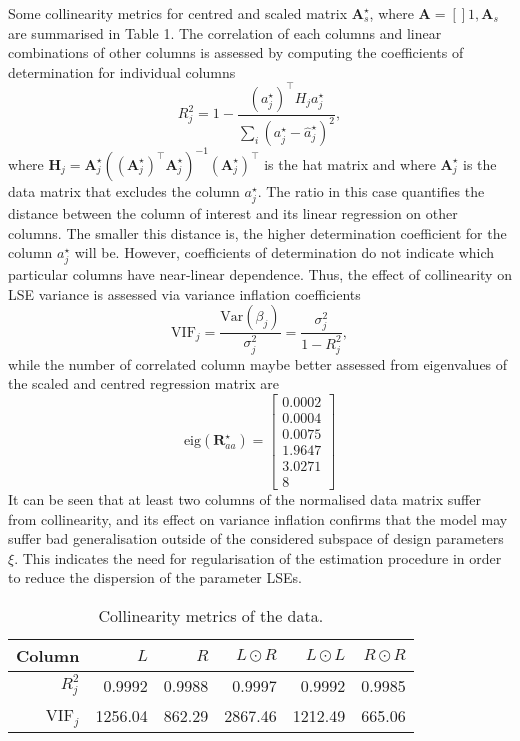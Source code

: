 \documentclass[a4paper,11pt,twoside]{article}
\theoremstyle{mytheoremstyle}
\begin{document}
Some collinearity metrics for centred and scaled matrix $\mathbf{A}_{s}^{\star}$, where $\mathbf{A} = \left[\right]1, \mathbf{A}_{s}$ are summarised in Table 1. The correlation of each columns and linear combinations of other columns is assessed by computing the coefficients of determination for individual columns
\begin{equation*}
R^{2}_{j} = 1 - \frac{(a^{\star}_{j})^{\top} H_j a^{\star}_{j}}{\sum_{i}( a^{\star}_{j} - \hat{a}^{\star}_{j})^2},
\end{equation*} 
where $ \mathbf{H}_j = \mathbf{A}_{j}^{\star}((\mathbf{A}_{j}^{\star})^{\top}\mathbf{A}_{j}^{\star})^{-1}(\mathbf{A}_{j}^{\star})^{\top}$ is the hat matrix and where $\mathbf{A}_{j}^{\star}$ is the data matrix that excludes the column $a^{\star}_{j}$. The ratio in this case quantifies the distance between the column of interest and its linear  regression on other columns. The smaller this distance is, the higher determination coefficient for the column $a^{\star}_{j}$ will be. However, coefficients of determination do not indicate which particular columns have near-linear dependence. Thus, the effect of collinearity on LSE variance is assessed via variance inflation coefficients
\begin{equation*}
\text{VIF}_j = \frac{\text{Var}(\beta_j)}{\sigma^{2}_{j}} = \frac{\sigma^{2}_{j}}{1 - R^{2}_{j}},
\end{equation*}
while the number of correlated column maybe better assessed from eigenvalues of the scaled and centred regression matrix are
\begin{equation*}
\text{eig}(\mathbf{R}^{\star}_{aa}) = \left[\begin{array}{r}
0.0002\\
0.0004\\
0.0075\\
1.9647\\
3.0271\\
8
\end{array}\right]
\end{equation*}
It can be seen that at least two columns of the normalised data matrix suffer from collinearity, and its effect on variance inflation confirms that the model may suffer bad generalisation outside of the considered subspace of design parameters $\xi$. This indicates the need for regularisation of the estimation procedure in order to reduce the dispersion of the parameter LSEs.
\begin{table}[!h]
	\centering
	\caption{Collinearity metrics of the data.}\label{tab:vifs}
	\begin{tabular}{rrrrrr}
		Column & $L$ & $R$ & $L \odot R$ & $L \odot L$ & $R \odot R$ \\
		\hline
		$R^{2}_{j}$ & 0.9992  &  0.9988  &  0.9997  &  0.9992  &  0.9985 \\
		VIF$_j$ & 1256.04 & 862.29 & 2867.46 & 1212.49 & 665.06 \\
		\hline
	\end{tabular}
\end{table}
\end{document}
